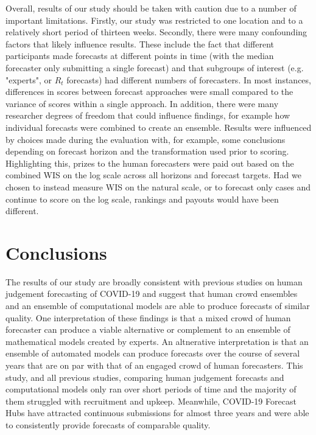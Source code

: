 \documentclass[10pt,a4paper,twocolumn]{article}
\begin{document}
Overall, results of our study should be taken with caution due to a number of important limitations. Firstly, our study was restricted to one location and to a relatively short period of thirteen weeks. Secondly, there were many confounding factors that likely influence results. These include the fact that different participants made forecasts at different points in time (with the median forecaster only submitting a single forecast) and that subgroups of interest (e.g. "experts", or $R_t$ forecasts) had different numbers of forecasters. 
In most instances, differences in scores between forecast approaches were small compared to the variance of scores within a single approach. In addition, there were many researcher degrees of freedom that could influence findings, for example how individual forecasts were combined to create an ensemble. Results were influenced by choices made during the evaluation with, for example, some conclusions  depending on forecast horizon and the transformation used prior to scoring. 
Highlighting this, prizes to the human forecasters were paid out based on the combined WIS on the log scale across all horizons and forecast targets. Had we chosen to instead measure WIS on the natural scale, or to forecast only cases and continue to score on the log scale, rankings and payouts would have been different. 


\section*{Conclusions}

The results of our study are broadly consistent with previous studies on human judgement forecasting of COVID-19 and suggest that human crowd ensembles and an ensemble of computational models are able to produce forecasts of similar quality. 
One interpretation of these findings is that a mixed crowd of human forecaster can produce a viable alternative or complement to an ensemble of mathematical models created by experts. An altnerative interpretation is that an ensemble of automated models can produce forecasts over the course of several years that are on par with that of an engaged crowd of human forecasters. This study, and all previous studies, comparing human judgement forecasts and computational models only ran over short periods of time and the majority of them struggled with recruitment and upkeep. Meanwhile, COVID-19 Forecast Hubs have attracted continuous submissions for almost three years and were able to consistently provide forecasts of comparable quality. 
\end{document}
